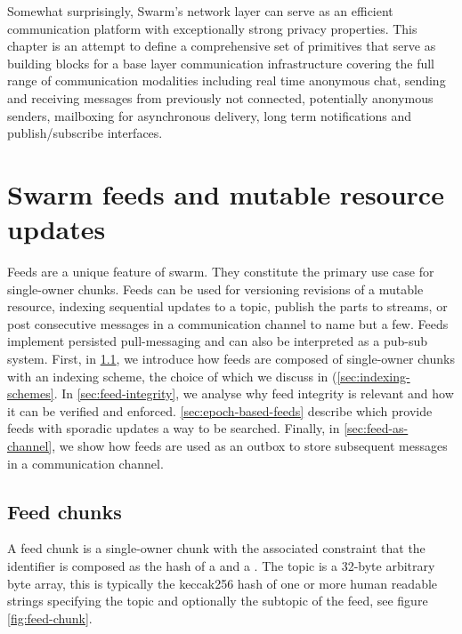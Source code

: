 
Somewhat surprisingly, Swarm's network layer can serve as an efficient  communication platform with exceptionally strong privacy properties. This chapter is an attempt to define a comprehensive set of primitives that serve as building blocks for a base layer communication infrastructure covering the full range of communication modalities including real time anonymous chat, sending and receiving messages from previously not connected, potentially anonymous senders, mailboxing for asynchronous delivery, long term notifications and  publish/subscribe interfaces. 


\section{Swarm feeds and mutable resource updates \statusyellow}\label{sec:feeds}


Feeds are a unique feature of swarm. They constitute the primary use case for single-owner chunks. Feeds can be used for versioning revisions of a mutable resource, indexing sequential updates to a topic, publish the parts to streams, or post consecutive messages in a communication channel to name but a few. Feeds implement persisted pull-messaging and can also be interpreted as a pub-sub system.
First, in \ref{sec:feed-chunks}, we introduce how feeds are composed of single-owner chunks with an indexing scheme, the choice of which we discuss in  (\ref{sec:indexing-schemes}. In \ref{sec:feed-integrity}, we analyse why feed integrity is relevant and how it can be verified and enforced. \ref{sec:epoch-based-feeds} describe  which provide feeds with sporadic updates a way to be searched. Finally, in \ref{sec:feed-as-channel}, we show how feeds are used as an outbox to store subsequent messages in a communication channel.


\subsection{Feed chunks \statusyellow}\label{sec:feed-chunks}

A feed chunk is a single-owner chunk with the associated constraint that the identifier is composed as the hash of a  and a . The topic is a 32-byte arbitrary byte array, this is typically the keccak256 hash of one or more human readable strings specifying the topic and optionally the subtopic of the feed, see figure \ref{fig:feed-chunk}. 


